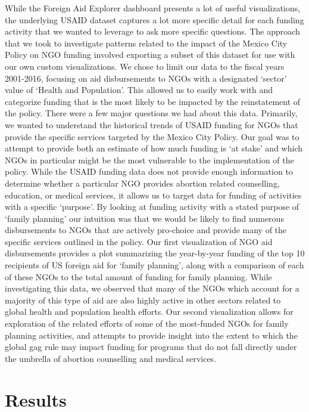 \documentclass[11pt,]{article}
\begin{document}
While the Foreign Aid Explorer dashboard presents a lot of useful
visualizations, the underlying USAID dataset captures a lot more
specific detail for each funding activity that we wanted to leverage to
ask more specific questions. The approach that we took to investigate
patterns related to the impact of the Mexico City Policy on NGO funding
involved exporting a subset of this dataset for use with our own custom
visualizations. We chose to limit our data to the fiscal years
2001-2016, focusing on aid disbursements to NGOs with a designated
`sector' value of `Health and Population'. This allowed us to easily
work with and categorize funding that is the most likely to be impacted
by the reinstatement of the policy. There were a few major questions we
had about this data. Primarily, we wanted to understand the historical
trends of USAID funding for NGOs that provide the specific services
targeted by the Mexico City Policy. Our goal was to attempt to provide
both an estimate of how much funding is `at stake' and which NGOs in
particular might be the most vulnerable to the implementation of the
policy. While the USAID funding data does not provide enough information
to determine whether a particular NGO provides abortion related
counselling, education, or medical services, it allows us to target data
for funding of activities with a specific `purpose'. By looking at
funding activity with a stated purpose of `family planning' our
intuition was that we would be likely to find numerous disbursements to
NGOs that are actively pro-choice and provide many of the specific
services outlined in the policy. Our first visualization of NGO aid
disbursements provides a plot summarizing the year-by-year funding of
the top 10 recipients of US foreign aid for `family planning', along
with a comparison of each of these NGOs to the total amount of funding
for family planning. While investigating this data, we observed that
many of the NGOs which account for a majority of this type of aid are
also highly active in other sectors related to global health and
population health efforts. Our second visualization allows for
exploration of the related efforts of some of the most-funded NGOs for
family planning activities, and attempts to provide insight into the
extent to which the global gag rule may impact funding for programs that
do not fall directly under the umbrella of abortion counselling and
medical services.

\section{Results}\label{results}
\end{document}
